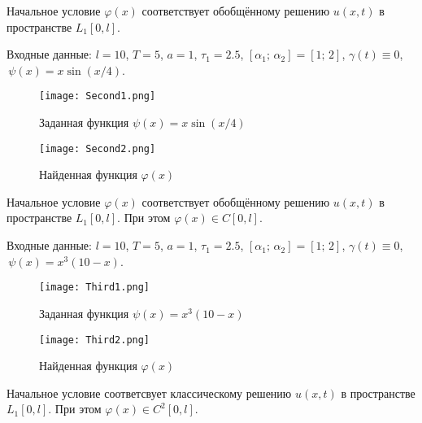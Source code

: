 \documentclass{article}
\theoremstyle{definition}
\begin{document}
Начальное условие $\varphi(x)$ соответствует обобщённому решению $u(x,t)$ в пространстве $L_1[0,l]$.
\goodbreak
\newpage	

Входные данные: 
$l = 10$,  $T = 5$,  $a = 1$, $\tau_1 = 2.5$, $[\alpha_1;\, \alpha_2] = [1;\, 2]$, 
$\gamma(t) \equiv 0$, $\,\psi(x) = x \sin(x/4)$.
\begin{figure}[H]
	\centering
	\texttt{[image: Second1.png]}
	\caption{Заданная функция $\psi(x) = x \sin(x/4)$}
	\label{fig:image3}
\end{figure}

\begin{figure}[H]
	\centering
	\texttt{[image: Second2.png]}
	\caption{Найденная функция $\varphi(x)$}
	\label{fig:image4}
\end{figure}

Начальное условие $\varphi(x)$ соответствует обобщённому решению $u(x,t)$ в пространстве $L_1[0,l]$. При этом
$\varphi(x) \in C[0,l]$.

\newpage	

Входные данные: 
$l = 10$,  $T = 5$,  $a = 1$, $\tau_1 = 2.5$, $[\alpha_1;\, \alpha_2] = [1;\, 2]$, 
$\gamma(t) \equiv 0$, $\,\psi(x) = x^3(10 - x)$.
\begin{figure}[H]
	\centering
	\texttt{[image: Third1.png]}
	\caption{Заданная функция $\psi(x) = x^3(10 - x)$}
	\label{fig:image5}
\end{figure}

\begin{figure}[H]
	\centering
	\texttt{[image: Third2.png]}
	\caption{Найденная функция $\varphi(x)$}
	\label{fig:image6}
\end{figure}

Начальное условие соответсвует классическому решению $u(x,t)$ в пространстве $L_1[0,l]$. При этом
$\varphi(x) \in C^2[0,l]$.

\newpage	
\end{document}
